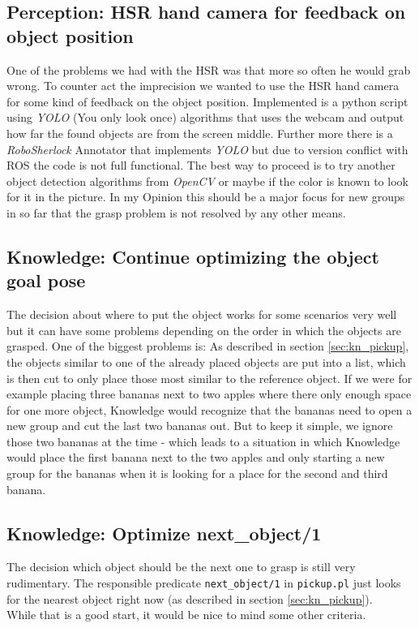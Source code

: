 \documentclass[main.tex]{subfiles}
\begin{document}
		\subsection{Perception: HSR hand camera for feedback on object position}
One of the problems we had with the HSR was that more so often he would grab wrong.
To counter act the imprecision we wanted to use the HSR hand camera for some kind of feedback on the object position.
Implemented is a python script using \textit{YOLO} (You only look once) algorithms that uses the webcam and output how far the found objects are from the screen middle.
Further more there is a \textit{RoboSherlock} Annotator that implements \textit{YOLO} but due to version conflict with ROS the code is not full functional.
The best way to proceed is to try another object detection algorithms from \textit{OpenCV} or maybe if the color is known to look for it in the picture.
In my Opinion this should be a major focus for new groups in so far that the grasp problem is not resolved by any other means.

		\subsection{Knowledge: Continue optimizing the object goal pose}
		The decision about where to put the object works for some scenarios very well but it can have some problems depending on the order in which the objects are grasped. One of the biggest problems is: As described in section \ref{sec:kn_pickup}, the objects  similar to one of the already placed objects are put into a list, which is then cut to only place those most similar to the reference object. If we were for example placing three bananas next to two apples where there only enough space for one more object, Knowledge would recognize that the bananas need to open a new group and cut the last two bananas out. But to keep it simple, we ignore those two bananas at the time - which leads to a situation in which Knowledge would place the first banana next to the two apples and only starting a new group for the bananas when it is looking for a place for the second and third banana.
	  	
	  	\subsection{Knowledge: Optimize next\_object/1}
	  	The decision which object should be the next one to grasp is still very rudimentary. The responsible predicate \texttt{next\_object/1} in \texttt{pickup.pl} just looks for the nearest object right now (as described in section \ref{sec:kn_pickup}).\\
	  	While that is a good start, it would be nice to mind some other criteria.
	  	
\end{document}

